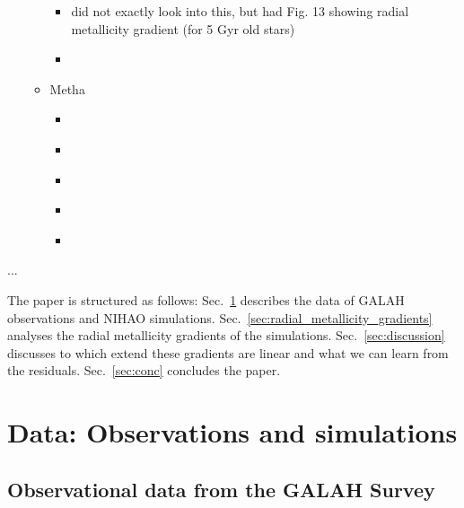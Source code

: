 \documentclass[fleqn,usenatbib]{mnras}
\begin{document}
\begin{itemize}
\begin{itemize}
\begin{itemize}
            \item \cite{Carrillo2023} did not exactly look into this, but had Fig. 13 showing radial metallicity gradient (for 5 Gyr old stars)
            \item \citep{Graf2024}  
        \end{itemize}
        \item Metha
        \begin{itemize}
            \item \cite{Metha2021}
            \item \cite{Metha2022}
            \item \cite{Metha2023}
            \item \cite{Metha2024}
            \item \cite{Metha2024b}
        \end{itemize}
    \end{itemize}
\end{itemize}


...

The paper is structured as follows: Sec.~\ref{sec:data} describes the data of GALAH observations and NIHAO simulations. Sec.~\ref{sec:radial_metallicity_gradients} analyses the radial metallicity gradients of the simulations. Sec.~\ref{sec:discussion} discusses to which extend these gradients are linear and what we can learn from the residuals. Sec.~\ref{sec:conc} concludes the paper.

\section{Data: Observations and simulations} \label{sec:data}

\subsection{Observational data from the GALAH Survey}\label{sec:obs_data}

\end{document}
